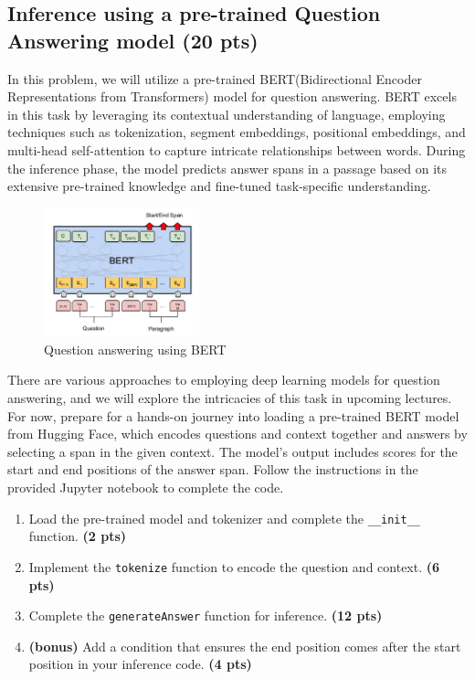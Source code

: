 \documentclass{assignment format}
\begin{document}
\subsection{Inference using a pre-trained Question Answering model (20 pts)}
In this problem, we will utilize a pre-trained BERT(Bidirectional Encoder Representations from Transformers) model for question answering. BERT excels in this task by leveraging its contextual understanding of language, employing techniques such as tokenization, segment embeddings, positional embeddings, and multi-head self-attention to capture intricate relationships between words. During the inference phase, the model predicts answer spans in a passage based on its extensive pre-trained knowledge and fine-tuned task-specific understanding. 

\begin{figure}[h]
    \centering
    \includegraphics[width=0.4\textwidth]{bert_qa.png}
    \caption{Question answering using BERT}
    \label{fig:word2vec}
\end{figure}

There are various approaches to employing deep learning models for question answering, and we will explore the intricacies of this task in upcoming lectures. For now, prepare for a hands-on journey into loading a pre-trained BERT model from Hugging Face, which encodes questions and context together and answers by selecting a span in the given context. The model's output includes scores for the start and end positions of the answer span. Follow the instructions in the provided Jupyter notebook to complete the code.


\begin{enumerate}[label=(\alph*)]
    \item Load the pre-trained model and tokenizer and complete the \texttt{\_\_init\_\_} function. \textbf{(2 pts)}
    \item Implement the \texttt{tokenize} function to encode the question and context. \textbf{(6 pts)}
    \item Complete the \texttt{generateAnswer} function for inference. \textbf{(12 pts)}
    \item \textbf{(bonus)} Add a condition that ensures the end position comes after the start position in your inference code. \textbf{(4 pts)}
\end{enumerate}
\end{document}
